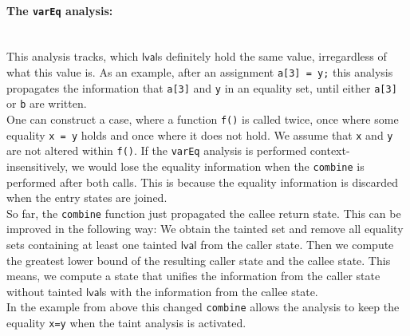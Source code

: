       \paragraph{The \texttt{varEq} analysis:}\mbox{}\\
        This analysis tracks, which $\textsf{lval}$s definitely hold the same value, irregardless of what this value is. As an example, after an assignment \texttt{a[3] = y;} this analysis propagates the information that \texttt{a[3]} and \texttt{y} in an equality set, until either \texttt{a[3]} or \texttt{b} are written.\\
        One can construct a case, where a function \texttt{f()} is called twice, once where some equality \texttt{x = y} holds and once where it does not hold. We assume that \texttt{x} and \texttt{y} are not altered within \texttt{f()}. If the \texttt{varEq} analysis is performed context-insensitively, we would lose the equality information when the \texttt{combine} is performed after both calls. This is because the equality information is discarded when the entry states are joined.\\
        So far, the \texttt{combine} function just propagated the callee return state. This can be improved in the following way: We obtain the tainted set and remove all equality sets containing at least one tainted $\textsf{lval}$ from the caller state. Then we compute the greatest lower bound of the resulting caller state and the callee state. This means, we compute a state that unifies the information from the caller state without tainted $\textsf{lval}$s with the information from the callee state.\\
        In the example from above this changed \texttt{combine} allows the analysis to keep the equality \texttt{x=y} when the taint analysis is activated.

